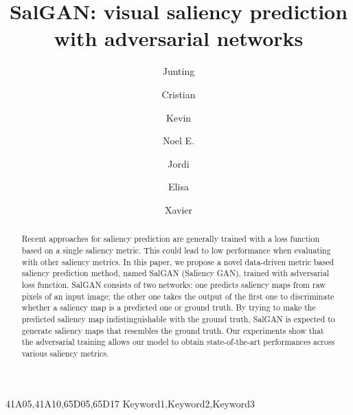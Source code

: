 \documentclass[times,twocolumn,final,authoryear]{elsarticle}
\begin{document}
\ifpreprint
  \setcounter{page}{1}
\else
  \setcounter{page}{1}
\fi

\begin{frontmatter}

\title{SalGAN: visual saliency prediction with adversarial networks}

\author[1]{Junting }
\author[2]{Cristian }
\author[3]{Kevin }
\author[3]{Noel E. }
\author[4]{Jordi }
\author[1]{Elisa }
\author[1]{Xavier } 

\address[1]{Universitat Politecnica de Catalunya, Barcelona 08034, Catalonia/Spain}
\address[2]{Facebook AML, Seattle, WA, United States of America}
\address[3]{Insight Center for Data Analytics, Dublin City University, Dublin 9, Ireland}
\address[4]{Barcelona Supercomputing Center, Barcelona 08034, Catalonia/Spain}


\begin{abstract}
Recent approaches for saliency prediction are generally trained with a loss function based on a single saliency metric.  This could lead to low  performance when evaluating with other saliency metrics.  
In this paper, we propose a novel data-driven metric based saliency prediction method, named SalGAN (Saliency GAN), trained with adversarial loss function. SalGAN consists of two networks: one predicts saliency maps from raw pixels of an input image; the other one takes the output of the first one to discriminate whether a saliency map is a predicted one or ground truth.
By trying to make the predicted saliency map indistinguishable with the ground truth, SalGAN is expected to generate saliency maps that resembles the ground truth. Our experiments show that the adversarial training allows our model to obtain state-of-the-art performances across various saliency metrics.
\end{abstract}

\begin{keyword}
\MSC 41A05\sep 41A10\sep 65D05\sep 65D17
\KWD Keyword1\sep Keyword2\sep Keyword3

\end{keyword}

\end{frontmatter}
\end{document}
